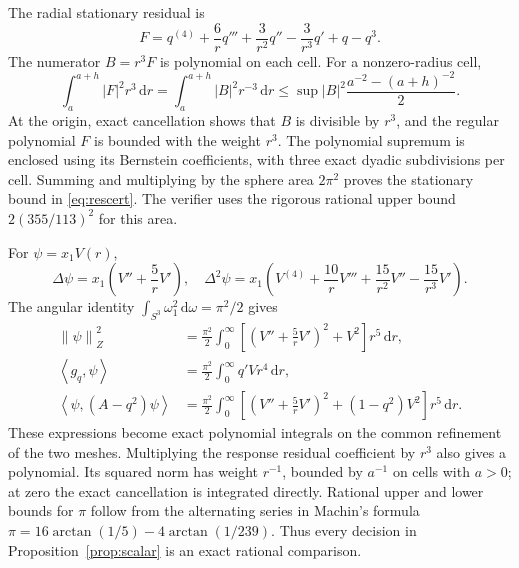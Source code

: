 \documentclass[11pt,a4paper]{article}
\theoremstyle{definition}\newtheorem{definition}[theorem]{Definition}
\theoremstyle{remark}\newtheorem{remark}[theorem]{Remark}
\newcommand{\dd}{\,\mathrm d}
\newcommand{\norm}[1]{\left\|#1\right\|}
\newcommand{\ip}[2]{\left\langle #1,#2\right\rangle}
\begin{document}
The radial stationary residual is
\begin{equation}\label{eq:radres}
 F=q^{(4)}+\frac6r q'''+\frac3{r^2}q''-\frac3{r^3}q'+q-q^3.
\end{equation}
The numerator \(B=r^3F\) is polynomial on each cell. For a nonzero-radius cell,
\[
 \int_a^{a+h}|F|^2r^3\dd r
 =\int_a^{a+h}|B|^2r^{-3}\dd r
 \le \sup|B|^2\frac{a^{-2}-(a+h)^{-2}}2.
\]
At the origin, exact cancellation shows that \(B\) is divisible by \(r^3\), and the regular polynomial \(F\) is bounded with the weight \(r^3\). The polynomial supremum is enclosed using its Bernstein coefficients, with three exact dyadic subdivisions per cell. Summing and multiplying by the sphere area \(2\pi^2\) proves the stationary bound in \eqref{eq:rescert}. The verifier uses the rigorous rational upper bound \(2(355/113)^2\) for this area.

For \(\psi=x_1V(r)\),
\[
 \Delta\psi=x_1\left(V''+\frac5rV'\right),\quad
 \Delta^2\psi=x_1\left(V^{(4)}+\frac{10}rV'''
 +\frac{15}{r^2}V''-\frac{15}{r^3}V'\right).
\]
The angular identity \(\int_{S^3}\omega_1^2\dd\omega=\pi^2/2\) gives
\begin{align}
 \norm\psi_Z^2&=\frac{\pi^2}2\int_0^\infty
 \left[\left(V''+\frac5rV'\right)^2+V^2\right]r^5\dd r,\label{eq:psinorm}\\
 \ip{g_q}{\psi}&=\frac{\pi^2}2\int_0^\infty q'V r^4\dd r,\label{eq:pairint}\\
 \ip\psi{(A-q^2)\psi}&=\frac{\pi^2}2\int_0^\infty
 \left[\left(V''+\frac5rV'\right)^2+(1-q^2)V^2\right]r^5\dd r.\label{eq:formint}
\end{align}
These expressions become exact polynomial integrals on the common refinement of the two meshes. Multiplying the response residual coefficient by \(r^3\) also gives a polynomial. Its squared norm has weight \(r^{-1}\), bounded by \(a^{-1}\) on cells with \(a>0\); at zero the exact cancellation is integrated directly. Rational upper and lower bounds for \(\pi\) follow from the alternating series in Machin's formula
\(\pi=16\arctan(1/5)-4\arctan(1/239)\).
Thus every decision in Proposition~\ref{prop:scalar} is an exact rational comparison.
\end{document}
